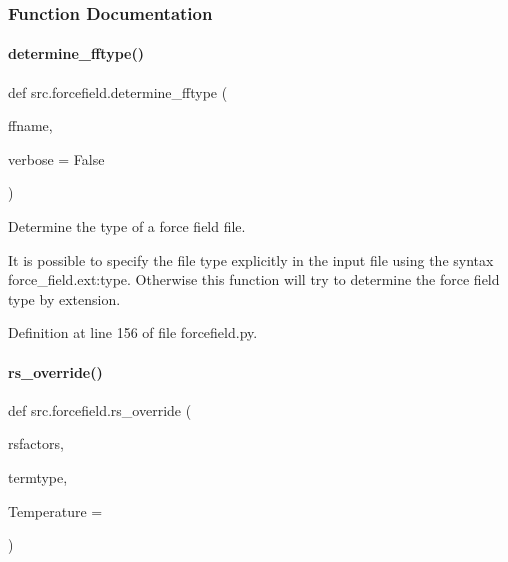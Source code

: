 \subsubsection{Function Documentation}
\mbox{\label{namespacesrc_1_1forcefield_a21066ef8f8395e0b0c7cc6700791d70b}} 
\paragraph{\texorpdfstring{determine\+\_\+fftype()}{determine\_fftype()}}
{\footnotesize\ttfamily def src.\+forcefield.\+determine\+\_\+fftype (\begin{DoxyParamCaption}\item[{}]{ffname,  }\item[{}]{verbose = {\ttfamily False} }\end{DoxyParamCaption})}



Determine the type of a force field file. 

It is possible to specify the file type explicitly in the input file using the syntax \textquotesingle{}force\+\_\+field.\+ext\+:type\textquotesingle{}. Otherwise this function will try to determine the force field type by extension. 

Definition at line 156 of file forcefield.\+py.

\mbox{\label{namespacesrc_1_1forcefield_a2dd794c9844e1c875997ab1b21f4284a}} 
\paragraph{\texorpdfstring{rs\+\_\+override()}{rs\_override()}}
{\footnotesize\ttfamily def src.\+forcefield.\+rs\+\_\+override (\begin{DoxyParamCaption}\item[{}]{rsfactors,  }\item[{}]{termtype,  }\item[{}]{Temperature = {} }\end{DoxyParamCaption})}



